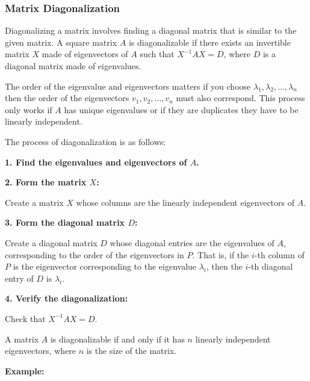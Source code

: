 \subsubsection{Matrix Diagonalization}

Diagonalizing a matrix involves finding a diagonal matrix that is similar to the given matrix. 
A square matrix \(A\) is diagonalizable if there exists an invertible matrix \(X\) made of eigenvectors of 
\(A\) such that \(X^{-1}AX = D\), where \(D\) is a diagonal matrix made of eigenvalues.
\vspace{\baselineskip}

The order of the eigenvalue and eigenvectors matters if you choose 
\(\lambda_1, \lambda_2, \dots, \lambda_n\) then the order of the eigenvectors 
\(v_1, v_2, \dots, v_n\) must also correspond. This process only works if \(A\) 
has unique eigenvalues or if they are duplicates they have to be linearly independent.
\vspace{\baselineskip}

The process of diagonalization is as follows:
\vspace{\baselineskip}

\textbf{1. Find the eigenvalues and eigenvectors of \(A\).}
\vspace{\baselineskip}

\textbf{2. Form the matrix \(X\):}

Create a matrix \(X\) whose columns are the linearly independent eigenvectors of \(A\).
\vspace{\baselineskip}

\textbf{3. Form the diagonal matrix \(D\):} 

Create a diagonal matrix \(D\) whose diagonal entries are the eigenvalues of \(A\), corresponding to 
the order of the eigenvectors in \(P\). That is, if the \(i\)-th column of \(P\) is the eigenvector 
corresponding to the eigenvalue \(\lambda_i\), then the \(i\)-th diagonal entry of \(D\) is \(\lambda_i\).
\vspace{\baselineskip}

\textbf{4. Verify the diagonalization:}
    
Check that \(X^{-1}AX = D\).
\vspace{\baselineskip}

A matrix \(A\) is diagonalizable if and only if it has \(n\) linearly independent eigenvectors, where 
\(n\) is the size of the matrix.
\vspace{\baselineskip}

\textbf{Example: }
\vspace{\baselineskip}

